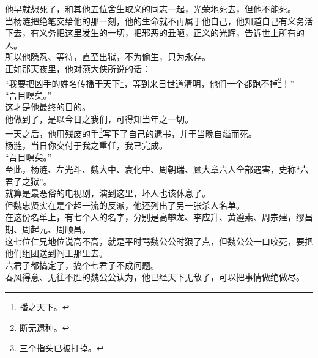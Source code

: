 \begin{multicols}{\theparacolNo}
他早就想死了，和其他五位舍生取义的同志一起，光荣地死去，但他不能死。\\

当杨涟把绝笔交给他的那一刻，他的生命就不再属于他自己，他知道自己有义务活下去，有义务把这里发生的一切，把邪恶的丑陋，正义的光辉，告诉世上所有的人。\\

所以他隐忍、等待，直至出狱，不为偷生，只为永存。\\

正如那天夜里，他对燕大侠所说的话：\\

“我要把凶手的姓名传播于天下\footnote{播之天下。}，等到来日世道清明，他们一个都跑不掉\footnote{断无遗种。}！”\\

“吾目暝矣。”\\

这才是他最终的目的。\\

他做到了，是以今日之我们，可得知当年之一切。\\

一天之后，他用残废的手\footnote{三个指头已被打掉。}写下了自己的遗书，并于当晚自缢而死。\\

杨涟，当日你交付于我之重任，我已完成。\\

“吾目暝矣。”\\

至此，杨涟、左光斗、魏大中、袁化中、周朝瑞、顾大章六人全部遇害，史称“六君子之狱”。\\

就算是最恶俗的电视剧，演到这里，坏人也该休息了。\\

但魏忠贤实在是个超一流的反派，他还列出了另一张杀人名单。\\

在这份名单上，有七个人的名字，分别是高攀龙、李应升、黄遵素、周宗建，缪昌期、周起元、周顺昌。\\

这七位仁兄地位说高不高，就是平时骂魏公公时狠了点，但魏公公一口咬死，要把他们组团送到阎王那里去。\\

六君子都搞定了，搞个七君子不成问题。\\

春风得意、无往不胜的魏公公认为，他已经天下无敌了，可以把事情做绝做尽。\\


\end{multicols}

